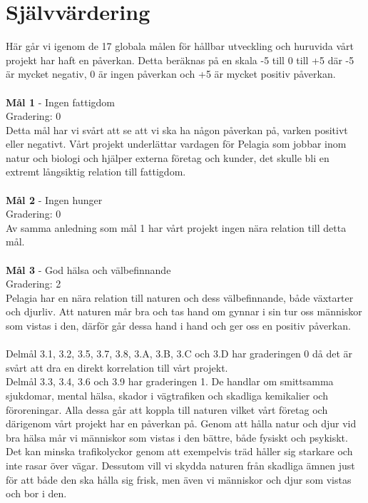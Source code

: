 \section{Självvärdering}
Här går vi igenom de 17 globala målen för hållbar utveckling och huruvida vårt projekt har haft en påverkan. Detta beräknas på en skala -5 till 0 till +5 där -5 är mycket negativ, 0 är ingen påverkan och +5 är mycket positiv påverkan. 
\\
\\
\textbf{Mål 1}
 - Ingen fattigdom
\\
Gradering: 0 
\\
Detta mål har vi svårt att se att vi ska ha någon påverkan på, varken positivt eller negativt. Vårt projekt underlättar vardagen för Pelagia som jobbar inom natur och biologi och hjälper externa företag och kunder, det skulle bli en extremt långsiktig relation till fattigdom. 
\\
\\
\textbf{Mål 2}
 - Ingen hunger
\\
Gradering: 0
\\
Av samma anledning som mål 1 har vårt projekt ingen nära relation till detta mål. 
\\
\\
\textbf{Mål 3}
 - God hälsa och välbefinnande
\\
Gradering: 2
\\
Pelagia har en nära relation till naturen och dess välbefinnande, både växtarter och djurliv. Att naturen mår bra och tas hand om gynnar i sin tur oss människor som vistas i den, därför går dessa hand i hand och ger oss en positiv påverkan.
\\
\\
Delmål 3.1, 3.2, 3.5, 3.7, 3.8, 3.A, 3.B, 3.C och 3.D har graderingen 0 då det är svårt att dra en direkt korrelation till vårt projekt.
\\
Delmål 3.3, 3.4, 3.6 och 3.9 har graderingen 1. De handlar om smittsamma sjukdomar, mental hälsa, skador i vägtrafiken och skadliga kemikalier och föroreningar. Alla dessa går att koppla till naturen vilket vårt företag och därigenom vårt projekt har en påverkan på. Genom att hålla natur och djur vid bra hälsa mår vi människor som vistas i den bättre, både fysiskt och psykiskt. Det kan minska trafikolyckor genom att exempelvis träd håller sig starkare och inte rasar över vägar. Dessutom vill vi skydda naturen från skadliga ämnen just för att både den ska hålla sig frisk, men även vi människor och djur som vistas och bor i den.
\\
